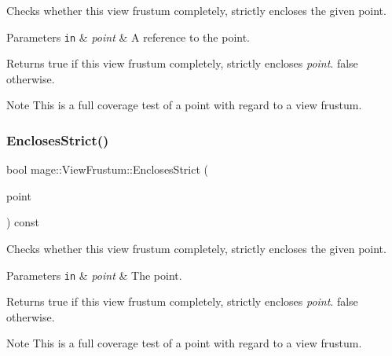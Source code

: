 Checks whether this view frustum completely, strictly encloses the given point.


\begin{DoxyParams}[1]{Parameters}
\mbox{\tt in}  & {\em point} & A reference to the point. \\
\hline
\end{DoxyParams}
\begin{DoxyReturn}{Returns}
{\ttfamily true} if this view frustum completely, strictly encloses {\itshape point}. {\ttfamily false} otherwise. 
\end{DoxyReturn}
\begin{DoxyNote}{Note}
This is a full coverage test of a point with regard to a view frustum. 
\end{DoxyNote}
\hypertarget{structmage_1_1_view_frustum_a9eaa1d0fcb7e896ff13e2bc7603d613c}{}\label{structmage_1_1_view_frustum_a9eaa1d0fcb7e896ff13e2bc7603d613c} 
\subsubsection{\texorpdfstring{Encloses\+Strict()}{EnclosesStrict()}\hspace{0.1cm}{\footnotesize\ttfamily [2/4]}}
{\footnotesize\ttfamily bool mage\+::\+View\+Frustum\+::\+Encloses\+Strict (\begin{DoxyParamCaption}\item[{F\+X\+M\+V\+E\+C\+T\+OR}]{point }\end{DoxyParamCaption}) const\hspace{0.3cm}{\ttfamily [noexcept]}}

Checks whether this view frustum completely, strictly encloses the given point.


\begin{DoxyParams}[1]{Parameters}
\mbox{\tt in}  & {\em point} & The point. \\
\hline
\end{DoxyParams}
\begin{DoxyReturn}{Returns}
{\ttfamily true} if this view frustum completely, strictly encloses {\itshape point}. {\ttfamily false} otherwise. 
\end{DoxyReturn}
\begin{DoxyNote}{Note}
This is a full coverage test of a point with regard to a view frustum. 
\end{DoxyNote}
\hypertarget{structmage_1_1_view_frustum_a7a0d293c4f3d1f29c54f45f00a7ca51f}{}\label{structmage_1_1_view_frustum_a7a0d293c4f3d1f29c54f45f00a7ca51f} 
